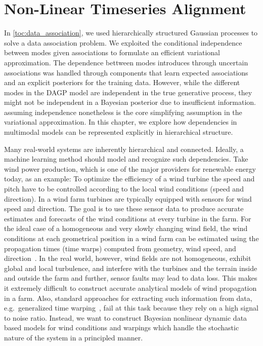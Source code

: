 \chapter{Non-Linear Timeseries Alignment}
\label{toc:alignment}
In \cref{toc:data_association}, we used hierarchically structured Gaussian processes to solve a data association problem.
We exploited the conditional independence between modes given associations to formulate an efficient variational approximation.
The dependence bettween modes introduces through uncertain associations was handled through components that learn expected associations and an explicit posteriors for the training data.
However, while the different modes in the DAGP model are independent in the true generative process, they might not be independent in a Bayesian posterior due to insufficient information.
assuming independence nonetheless is the core simplifying assumption in the variational approximation.
In this chapter, we explore how dependencies in multimodal models can be represented explicitly in hierarchical structure.

Many real-world systems are inherently hierarchical and connected.
Ideally, a machine learning method should model and recognize such dependencies.
Take wind power production, which is one of the major providers for renewable energy today, as an example:
To optimize the efficiency of a wind turbine the speed and pitch have to be controlled according to the local wind conditions (speed and direction).
In a wind farm turbines are typically equipped with sensors for wind speed and direction.
The goal is to use these sensor data to produce accurate estimates and forecasts of the wind conditions at every turbine in the farm.
For the ideal case of a homogeneous and very slowly changing wind field, the wind conditions at each geometrical position in a wind farm can be estimated using the propagation times (time warps) computed from geometry, wind speed, and direction~\parencite{soleimanzadeh_controller_2011,bitar_coordinated_2013,schepers_improved_2007}.
In the real world, however, wind fields are not homogeneous, exhibit global and local turbulence, and interfere with the turbines and the terrain inside and outside the farm and further, sensor faults may lead to data loss.
This makes it extremely difficult to construct accurate analytical models of wind propagation in a farm.
Also, standard approaches for extracting such information from data, e.g.\ generalized time warping~\parencite{zhou_generalized_2012}, fail at this task because they rely on a high signal to noise ratio.
Instead, we want to construct Bayesian nonlinear dynamic data based models for wind conditions and warpings which handle the stochastic nature of the system in a principled manner.

